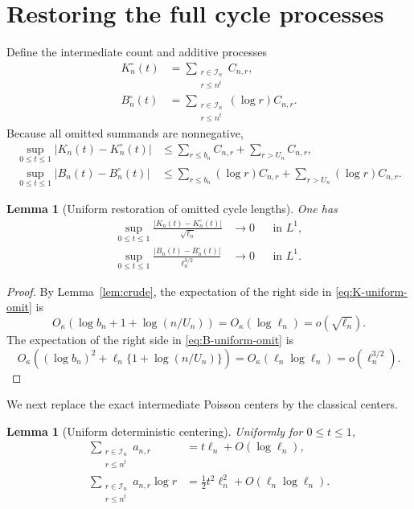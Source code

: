 \documentclass[11pt]{article}
\newtheorem{lemma}[theorem]{Lemma}
\theoremstyle{definition}
\theoremstyle{remark}
\newcommand{\cI}{\mathcal I}
\begin{document}
\section{Restoring the full cycle processes}

Define the intermediate count and additive processes
\begin{align}
 K_n^\circ(t)&=\sum_{\substack{r\in\cI_n\\r\le n^t}}C_{n,r},
 \label{eq:Kcirc}\\
 B_n^\circ(t)&=\sum_{\substack{r\in\cI_n\\r\le n^t}}(\log r)C_{n,r}.
 \label{eq:Bcirc-process}
\end{align}
Because all omitted summands are nonnegative,
\begin{align}
 \sup_{0\le t\le1}|K_n(t)-K_n^\circ(t)|
 &\le\sum_{r\le b_n}C_{n,r}+\sum_{r>U_n}C_{n,r},
 \label{eq:K-uniform-omit}\\
 \sup_{0\le t\le1}|B_n(t)-B_n^\circ(t)|
 &\le\sum_{r\le b_n}(\log r)C_{n,r}
 +\sum_{r>U_n}(\log r)C_{n,r}.
 \label{eq:B-uniform-omit}
\end{align}

\begin{lemma}[Uniform restoration of omitted cycle lengths]
\label{lem:restore}
One has
\begin{align}
 \sup_{0\le t\le1}
 \frac{|K_n(t)-K_n^\circ(t)|}{\sqrt{\ell_n}}
 &\longrightarrow0
 &&\text{in }L^1,
 \label{eq:restore-K}\\
 \sup_{0\le t\le1}
 \frac{|B_n(t)-B_n^\circ(t)|}{\ell_n^{3/2}}
 &\longrightarrow0
 &&\text{in }L^1.
 \label{eq:restore-B}
\end{align}
\end{lemma}

\begin{proof}
By Lemma~\ref{lem:crude}, the expectation of the right side in
\eqref{eq:K-uniform-omit} is
\[
 O_\kappa(\log b_n+1+\log(n/U_n))
 =O_\kappa(\log\ell_n)=o(\sqrt{\ell_n}).
\]
The expectation of the right side in \eqref{eq:B-uniform-omit} is
\[
 O_\kappa((\log b_n)^2+\ell_n\{1+\log(n/U_n)\})
 =O_\kappa(\ell_n\log\ell_n)
 =o(\ell_n^{3/2}).
\]
\end{proof}

We next replace the exact intermediate Poisson centers by the classical
centers.

\begin{lemma}[Uniform deterministic centering]
\label{lem:centering}
Uniformly for $0\le t\le1$,
\begin{align}
 \sum_{\substack{r\in\cI_n\\r\le n^t}}a_{n,r}
 &=t\ell_n+O(\log\ell_n),
 \label{eq:center-K}\\
 \sum_{\substack{r\in\cI_n\\r\le n^t}}a_{n,r}\log r
 &=\frac12t^2\ell_n^2+O(\ell_n\log\ell_n).
 \label{eq:center-B}
\end{align}
\end{lemma}
\end{document}
